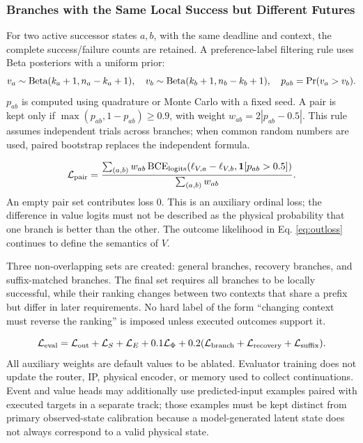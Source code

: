 \documentclass[
  10pt,
]{article}
\begin{document}
\hypertarget{nhuxe1nh-cuxf9ng-local-success-khuxe1c-tux1b0ux1a1ng-lai}{%
\subsubsection{Branches with the Same Local Success but Different Futures}\label{nhuxe1nh-cuxf9ng-local-success-khuxe1c-tux1b0ux1a1ng-lai}}

For two active successor states \(a,b\), with the same deadline and context, the complete success/failure counts are retained. A preference-label filtering rule uses Beta posteriors with a uniform prior:
\begin{equation}\label{eq:prefuncertainty}
v_a\sim{\rm Beta}(k_a+1,n_a-k_a+1),\quad
v_b\sim{\rm Beta}(k_b+1,n_b-k_b+1),\quad
p_{ab}=\Pr(v_a>v_b).
\end{equation}
\(p_{ab}\) is computed using quadrature or Monte Carlo with a fixed seed. A pair is kept only if \(\max(p_{ab},1-p_{ab})\geq0.9\), with weight \(w_{ab}=2|p_{ab}-0.5|\). This rule assumes independent trials across branches; when common random numbers are used, paired bootstrap replaces the independent formula.

\begin{equation}\label{eq:prefloss}
\mathcal L_{\rm pair}=
\frac{\sum_{(a,b)}w_{ab}\operatorname{BCE}_{\rm logits}(\ell_{V,a}-\ell_{V,b},\mathbf1[p_{ab}>0.5])}
{\sum_{(a,b)}w_{ab}}.
\end{equation}
An empty pair set contributes loss 0. This is an auxiliary ordinal loss; the difference in value logits must not be described as the physical probability that one branch is better than the other. The outcome likelihood in Eq. \eqref{eq:outloss} continues to define the semantics of \(V\).

Three non-overlapping sets are created: general branches, recovery branches, and suffix-matched branches. The final set requires all branches to be locally successful, while their ranking changes between two contexts that share a prefix but differ in later requirements. No hard label of the form ``changing context must reverse the ranking'' is imposed unless executed outcomes support it.

\begin{equation}\label{eq:totaleval}
\mathcal L_{\rm eval}=\mathcal L_{\rm out}+\mathcal L_S+\mathcal L_E
+0.1\mathcal L_\Phi
+0.2(\mathcal L_{\rm branch}+\mathcal L_{\rm recovery}+\mathcal L_{\rm suffix}).
\end{equation}
All auxiliary weights are default values to be ablated. Evaluator training does not update the router, IP, physical encoder, or memory used to collect continuations. Event and value heads may additionally use predicted-input examples paired with executed targets in a separate track; those examples must be kept distinct from primary observed-state calibration because a model-generated latent state does not always correspond to a valid physical state.
\end{document}
